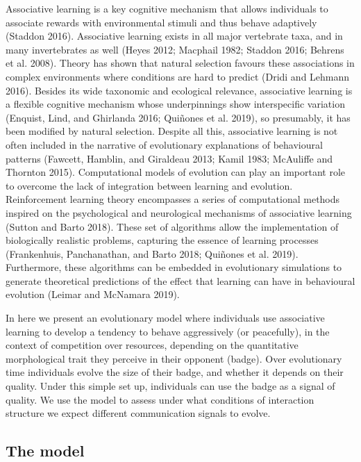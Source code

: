 \documentclass[
  12pt,
]{article}
\begin{document}
Associative learning is a key cognitive mechanism that allows
individuals to associate rewards with environmental stimuli and thus
behave adaptively (Staddon 2016). Associative learning exists in all
major vertebrate taxa, and in many invertebrates as well (Heyes 2012;
Macphail 1982; Staddon 2016; Behrens et al. 2008). Theory has shown that
natural selection favours these associations in complex environments
where conditions are hard to predict (Dridi and Lehmann 2016). Besides
its wide taxonomic and ecological relevance, associative learning is a
flexible cognitive mechanism whose underpinnings show interspecific
variation (Enquist, Lind, and Ghirlanda 2016; Quiñones et al. 2019), so
presumably, it has been modified by natural selection. Despite all this,
associative learning is not often included in the narrative of
evolutionary explanations of behavioural patterns (Fawcett, Hamblin, and
Giraldeau 2013; Kamil 1983; McAuliffe and Thornton 2015). Computational
models of evolution can play an important role to overcome the lack of
integration between learning and evolution. Reinforcement learning
theory encompasses a series of computational methods inspired on the
psychological and neurological mechanisms of associative learning
(Sutton and Barto 2018). These set of algorithms allow the
implementation of biologically realistic problems, capturing the essence
of learning processes (Frankenhuis, Panchanathan, and Barto 2018;
Quiñones et al. 2019). Furthermore, these algorithms can be embedded in
evolutionary simulations to generate theoretical predictions of the
effect that learning can have in behavioural evolution (Leimar and
McNamara 2019).

In here we present an evolutionary model where individuals use
associative learning to develop a tendency to behave aggressively (or
peacefully), in the context of competition over resources, depending on
the quantitative morphological trait they perceive in their opponent
(badge). Over evolutionary time individuals evolve the size of their
badge, and whether it depends on their quality. Under this simple set
up, individuals can use the badge as a signal of quality. We use the
model to assess under what conditions of interaction structure we expect
different communication signals to evolve.

\hypertarget{the-model}{%
\subsection{The model}\label{the-model}}
\end{document}
